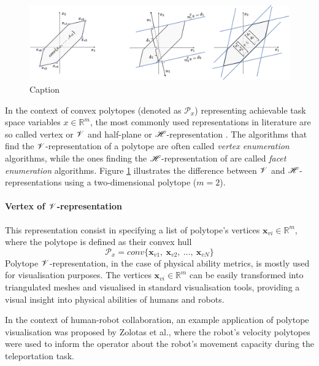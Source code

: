 \begin{figure}[!htb]
    \centering
    \includegraphics[width=\linewidth]{Chapters/imgs/h_v_rep.pdf}
    \caption{Caption}
    \label{fig:hv_rep}
\end{figure}

In the context of convex polytopes (denoted as $\mathcal{P}_x$) representing achievable task space variables $x\in\mathbb{R}^m$, the most commonly used representations in literature are so called vertex or $\mathscr{V}$ and half-plane or $\mathscr{H}$-representation \cite{henk2017basic, fukuda2004frequently}.  The algorithms that find the $\mathscr{V}$-representation of a polytope are often called \textit{vertex enumeration} algorithms, while the ones finding the $\mathscr{H}$-representation of are called \textit{facet enumeration} algorithms\cite{bremner_fukuda_marzetta_1998}. Figure \ref{fig:hv_rep} illustrates the difference between $\mathscr{V}$ and $\mathscr{H}$-representations using a two-dimensional polytope ($m = 2$). 

\paragraph*{Vertex of $\mathscr{V}$-representation}
This representation consist in specifying a list of polytope's vertices $\bm{x}_{vi}\in\mathbb{R}^m$, where the polytope is defined as their convex hull
\begin{equation}
\mathcal{P}_x = conv\{ \bm{x}_{v1},~\bm{x}_{v2},~ \ldots , ~\bm{x}_{vN} \}
\end{equation} 
Polytope $\mathscr{V}$-representation, in the case of physical ability metrics, is mostly used for visualisation purposes. The vertices $\bm{x}_{vi}\in\mathbb{R}^m$ can be easily transformed into triangulated meshes and visualised in standard visualisation tools, providing a visual insight into physical abilities of humans and robots. 

In the context of human-robot collaboration, an example application of polytope visualisation was proposed by Zolotas et al.\cite{Zolotas2021}, where the robot's velocity polytopes were used to inform the operator about the robot's movement capacity during the teleportation task.


